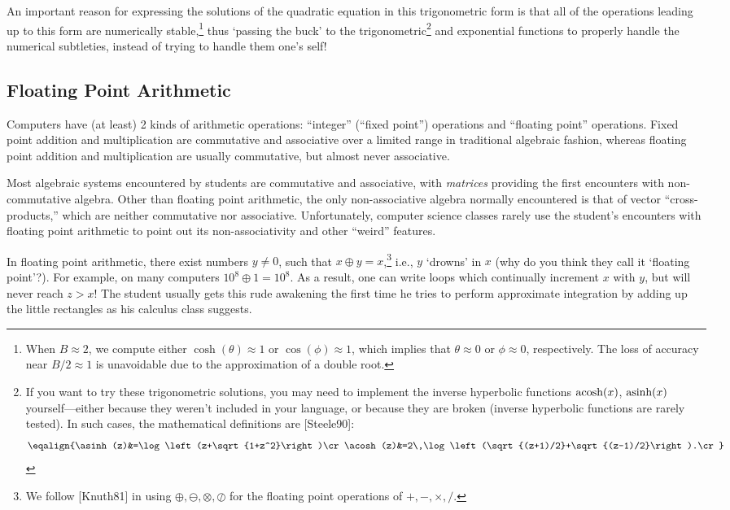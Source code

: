 \documentclass[twocolumn,epsf]{snBaker}
\begin{document}
An important reason for expressing the solutions of the quadratic
equation in this trigonometric form is that all of the operations
leading up to this form are numerically stable,\footnote{When
$B\approx 2$, we compute either $\cosh(\theta)\approx 1$ or
$\cos(\phi)\approx 1$, which implies that $\theta\approx 0$ or
$\phi\approx 0$, respectively.  The loss of accuracy near $B/2\approx
1$ is unavoidable due to the approximation of a double root.} thus
`passing the buck' to the trigonometric\footnote{If you want to try these
trigonometric solutions, you may need to implement the inverse
hyperbolic functions $\hbox{\rm acosh}(x)$, $\hbox{\rm asinh}(x)$
yourself---either because they weren't included in your language, or
because they are broken (inverse hyperbolic functions are rarely
tested).  In such cases, the mathematical definitions are [Steele90]:
$$\eqalign{\asinh(z)&=\log\left(z+\sqrt{1+z^2}\right)\cr
\acosh(z)&=2\,\log\left(\sqrt{(z+1)/2}+\sqrt{(z-1)/2}\right).\cr}$$}
and exponential functions to properly handle the numerical subtleties,
instead of trying to handle them one's self!

\subsection*{Floating Point Arithmetic}

Computers have (at least) 2 kinds of arithmetic operations:
``integer'' (``fixed point'') operations and ``floating point''
operations.  Fixed point addition and multiplication are commutative
and associative over a limited range in traditional algebraic fashion,
whereas floating point addition and multiplication are usually
commutative, but almost never associative.

Most algebraic systems encountered by students are commutative and
associative, with {\it matrices} providing the first encounters with
non-commutative algebra.  Other than floating point arithmetic, the
only non-associative algebra normally encountered is that of vector
``cross-products,'' which are neither commutative nor associative.
Unfortunately, computer science classes rarely use the student's
encounters with floating point arithmetic to point out its
non-associativity and other ``weird'' features.

In floating point arithmetic, there exist numbers $y\neq 0$, such that $x\oplus y=x$,\footnote{We
follow [Knuth81] in using $\oplus,\ominus,\otimes,\oslash$ for the
floating point operations of $+,-,{\times},/$.} i.e., $y$ `drowns' in $x$
(why do you think they call it `floating point'?).  For example, on
many computers $10^{8}\oplus 1=10^{8}$.  As a result, one can write
loops which continually increment $x$ with $y$, but will never reach
$z>x$!  The student usually gets this rude awakening the first time he
tries to perform approximate integration by adding up the little
rectangles as his calculus class suggests.
\end{document}
